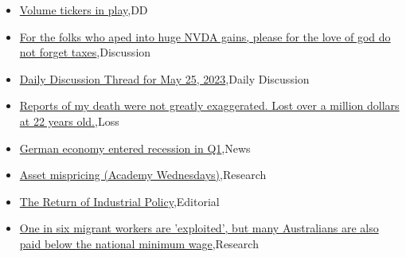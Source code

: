 \documentclass{article}%
\begin{document}
%
\begin{itemize}%
\item%
\href{https://reddit.com/r/wallstreetbets/comments/13rfzzh/volume\_tickers\_in\_play/}{Volume tickers in play},DD%
\item%
\href{https://reddit.com/r/wallstreetbets/comments/13rfnwb/for\_the\_folks\_who\_aped\_into\_huge\_nvda\_gains/}{For the folks who aped into huge NVDA gains, please for the love of god do not forget taxes},Discussion%
\item%
\href{https://reddit.com/r/wallstreetbets/comments/13rdhvh/daily\_discussion\_thread\_for\_may\_25\_2023/}{Daily Discussion Thread for May 25, 2023},Daily Discussion%
\item%
\href{https://reddit.com/r/wallstreetbets/comments/13rdd1r/reports\_of\_my\_death\_were\_not\_greatly\_exaggerated/}{Reports of my death were not greatly exaggerated. Lost over a million dollars at 22 years old.},Loss%
\item%
\href{https://reddit.com/r/wallstreetbets/comments/13rb2el/german\_economy\_entered\_recession\_in\_q1/}{German economy entered recession in Q1},News%
\item%
\href{https://reddit.com/r/Economics/comments/13qse5s/asset\_mispricing\_academy\_wednesdays/}{Asset mispricing (Academy Wednesdays)},Research%
\item%
\href{https://reddit.com/r/Economics/comments/13qgo4o/the\_return\_of\_industrial\_policy/}{The Return of Industrial Policy},Editorial%
\item%
\href{https://reddit.com/r/Economics/comments/13q6uj8/one\_in\_six\_migrant\_workers\_are\_exploited\_but\_many/}{One in six migrant workers are 'exploited', but many Australians are also paid below the national minimum wage},Research%
\end{itemize}%
\end{document}
